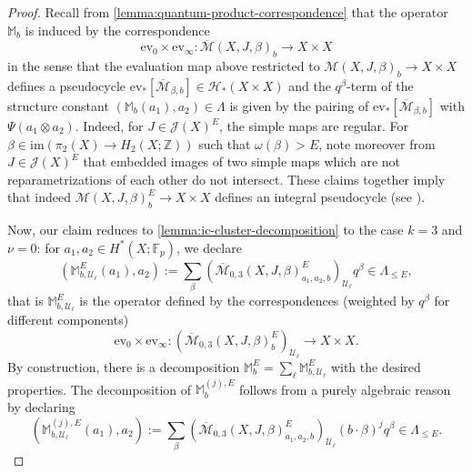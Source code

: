\documentclass[reqno]{amsart}
\numberwithin{equation}{section}
\numberwithin{equation}{section}
\numberwithin{equation}{section}
\theoremstyle{definition}
\theoremstyle{remark}
\theoremstyle{remark}
\newcommand{\ov}{\overline}
\begin{document}
\begin{proof}
    Recall from \cref{lemma:quantum-product-correspondence} that the operator $\mathbb{M}_b$ is induced by the correspondence
    \begin{equation}
        \mathrm{ev}_0 \times \mathrm{ev}_\infty : \ov{\mathcal{M}}(X, J, \beta)_b \to X \times X
    \end{equation}
    in the sense that the evaluation map above restricted to $\mathcal{M}(X,J,\beta)_b \to X \times X$ defines a pseudocycle $\mathrm{ev}_*[\ov{\mathcal{M}}_{\beta,b}] \in \mathcal{H}_*(X \times X)$ and the $q^\beta$-term of the structure constant $(\mathbb{M}_b(a_1), a_2) \in \Lambda$ is given by the pairing of $\mathrm{ev}_*[\ov{\mathcal{M}}_{\beta,b}]$ with $\Psi(a_1 \otimes a_2)$. Indeed, for $J \in \mathcal{J}(X)^E$, the simple maps are regular. For $\beta \in \mathrm{im}(\pi_2(X) \to H_2(X;\mathbb{Z}))$ such that $\omega(\beta) > E$, note moreover from $J \in \mathcal{J}(X)^E$ that embedded images of two simple maps which are not reparametrizations of each other do not intersect. These claims together imply that indeed $\mathcal{M}(X,J,\beta)_b^E \to X \times X$ defines an integral pseudocycle (see \cite[Section 6.2, 6.3]{MS12}).

    Now, our claim reduces to \cref{lemma:ic-cluster-decomposition} to the case $k=3$ and $\nu = 0$: for $a_1, a_2 \in H^*(X;\mathbb{F}_p)$, we declare
    \begin{equation}
        \left( \mathbb{M}^E_{b, \mathcal{U}_\ell} (a_1), a_2 \right) := \sum_\beta \left(\ov{\mathcal{M}}_{0,3}(X,J, \beta)_{a_1, a_2, b}^E \right)_{\mathcal{U}_\ell}  q^\beta \in \Lambda_{\le E},
    \end{equation}
    that is $\mathbb{M}_{b, \mathcal{U}_\ell}^E$ is the operator defined by the correspondences (weighted by $q^\beta$ for different components)
    \begin{equation}
        \mathrm{ev}_0 \times \mathrm{ev}_\infty : \left( \ov{\mathcal{M}}_{0,3}(X,J, \beta)^E_b \right)_{\mathcal{U}_\ell} \to X \times X.
    \end{equation}
    By construction, there is a decomposition $\mathbb{M}_b^E = \sum_\ell \mathbb{M}^E_{b,\mathcal{U}_\ell}$ with the desired properties. The decomposition of $\mathbb{M}_b^{(j), E}$ follows from a purely algebraic reason by declaring
     \begin{equation}
        \left( \mathbb{M}^{(j),E}_{b, \mathcal{U}_\ell} (a_1), a_2 \right) := \sum_\beta \left(\ov{\mathcal{M}}_{0,3}(X,J, \beta)_{a_1, a_2, b}^E \right)_{\mathcal{U}_\ell}  (b \cdot \beta)^j q^\beta \in \Lambda_{\le E}.
    \end{equation}
\end{proof}
\end{document}

